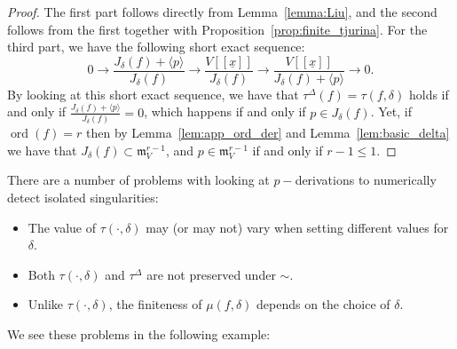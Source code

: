 \documentclass{article}
\DeclareMathOperator{\ord}{ord}
\newcommand{\maxV}{\mathfrak{m}_V}
\newcommand{\Vx}{V[[\underline{x}]]}
\numberwithin{theorem}{section}
\begin{document}
\begin{proof}
    The first part follows directly from Lemma~\ref{lemma:Liu}, and the second follows from the first together with Proposition~\ref{prop:finite_tjurina}. For the third part, we have the following short exact sequence:
    \begin{equation*}
        0 \to \frac{J_\delta\left(f\right) +\langle p \rangle}{J_\delta\left(f\right)} \to \frac{\Vx}{J_\delta\left(f\right)} \to \frac{\Vx}{J_\delta\left(f\right) + \langle p \rangle} \to 0. 
    \end{equation*}
    By looking at this short exact sequence, we have that $\tau^\Delta\left(f\right)=\tau(f, \delta)$ holds if and only if $\frac{J_\delta\left(f\right) +\langle p \rangle}{J_\delta\left(f\right)}=0$, which happens if and only if $p \in J_\delta\left(f\right)$. Yet, if $\ord\left(f\right)=r$ then by Lemma~\ref{lem:app_ord_der} and Lemma~\ref{lem:basic_delta} we have that $J_\delta\left(f\right) \subset \maxV^{r-1}$, and $p \in \maxV^{r-1}$ if and only if $r-1 \leq1$.
\end{proof}



\textup{There are a number of problems with looking at $p-$derivations to numerically detect isolated singularities:}
    \begin{itemize}
    \item \textup{The value of $\tau( \cdot, \delta)$ may (or may not) vary when setting different values for $\delta$.}
    \item \textup{Both $\tau(\cdot, \delta)$ and $\tau^\Delta$ are not preserved under $\sim$.}
    \item \textup{Unlike $\tau(\cdot,\delta)$, the finiteness of $\mu(f, \delta)$ depends on the choice of $\delta$.}
\end{itemize}

We see these problems in the following example:
\end{document}
